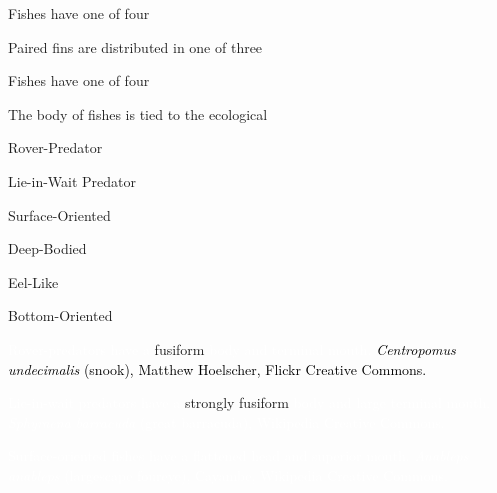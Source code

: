 \documentclass[t]{beamer}
\begin{document}
{
\begin{frame}[b,plain]{Fishes have one of four }
\end{frame}
}

{
\begin{frame}[b,plain]{Paired fins are distributed in one of three }
\end{frame}
}

{
\begin{frame}[b,plain]{Fishes have one of four }
\end{frame}
}

\begin{frame}[t,plain]{The body  of fishes is tied to the ecological }

\hangpara Rover-Predator

\hangpara Lie-in-Wait Predator

\hangpara Surface-Oriented

\hangpara Deep-Bodied

\hangpara Eel-Like

\hangpara Bottom-Oriented

\end{frame}

{
\begin{frame}[b,plain]{\textcolor{white}{Rover-predators have a} \textcolor{orange6}{fusiform} \textcolor{white}{body and terminal mouth.}}
\hfill\tiny\textcolor{black}{\textit{Centropomus undecimalis} (snook), Matthew Hoelscher, Flickr Creative Commons.}
\end{frame}
}

{
\begin{frame}[b,plain]{\textcolor{white}{Lie-in-wait predators have a} \textcolor{orange6}{strongly fusiform} \textcolor{white}{body and large terminal mouth.}}
\hfill\tiny\textcolor{white}{\textit{Sphyraena barracuda} (great barracuda), Wikipedia Creative Commons.}
\end{frame}
}

{
\begin{frame}[b,plain]{\textcolor{white}{Surface-oriented fishes have a flattened head and superior mouth.}}
\hfill\tiny\textcolor{white}{\textit{Anableps anableps} (largescape foureye), Cayambe, Wikipedia Creative Commons.}
\end{frame}
}
\end{document}
